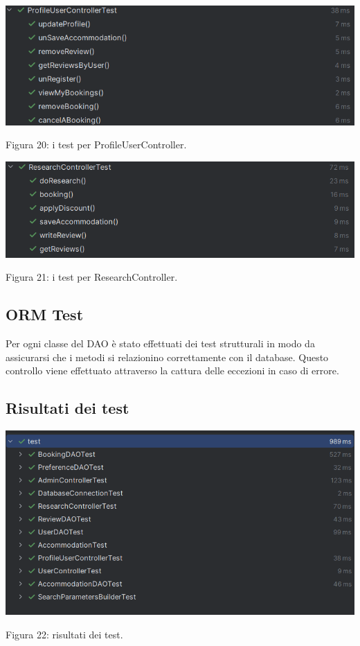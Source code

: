 \documentclass[10pt]{article}
\begin{document}
\begin{center}
\includegraphics[scale=0.55]{test/BusinessLogic/testProfileUserController}
\par\medskip
Figura 20: i test per ProfileUserController.
\par\medskip
\end{center}

\begin{center}
\includegraphics[scale=0.55]{test/BusinessLogic/testResearchController}
\par\medskip
Figura 21: i test per ResearchController.
\par\medskip
\end{center}

\subsection{ORM Test}

Per ogni classe del DAO è stato effettuati dei test strutturali in modo da assicurarsi che i metodi si relazionino correttamente con il database. Questo controllo viene effettuato attraverso la cattura delle eccezioni in caso di errore.

\subsection{Risultati dei test}
\par\medskip
\begin{center}
\includegraphics[scale=0.75]{test/BusinessLogic/risultatitest}
\par\medskip
Figura 22: risultati dei test.
\par\medskip
\end{center}
\end{document}
